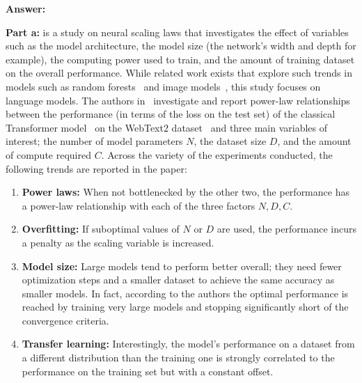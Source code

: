{\bf Answer:}

{\bf Part a:} \cite{kaplan2020scaling} is a study on neural scaling laws that investigates the effect of variables such as the model architecture, the model size (the network's width and depth for example), the computing power used to train, and the amount of training dataset on the overall performance. While related work exists that explore such trends in models such as random forests~\cite{biau2012analysis} and image models~\cite{tan2019efficientnet}, this study focuses on language models. The authors in~\cite{kaplan2020scaling} investigate and report power-law relationships between the performance (in terms of the loss on the test set) of the classical Transformer model~\cite{vaswani2017attention} on the WebText2 dataset~\cite{radford2019language} and three main variables of interest; the number of model parameters $N$, the dataset size $D$, and the amount of compute required $C$. Across the variety of the experiments conducted, the following trends are reported in the paper:
\begin{enumerate}
\item {\bf Power laws:} When not bottlenecked by the other two, the performance has a power-law relationship with each of the three factors $N, D, C$.
\item {\bf Overfitting:} If suboptimal values of $N$ or $D$ are used, the performance incurs a penalty as the scaling variable is increased.
\item {\bf Model size:} Large models tend to perform better overall; they need fewer optimization steps and a smaller dataset to achieve the same accuracy as smaller models. In fact, according to the authors the optimal performance is reached by training very large models and stopping significantly short of the convergence criteria.
\item {\bf Transfer learning:} Interestingly, the model's performance on a dataset from a different distribution than the training one is strongly correlated to the performance on the training set but with a constant offset.
\end{enumerate}
%
